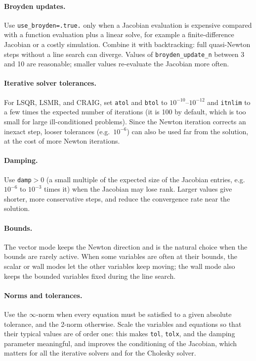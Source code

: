 \documentclass[11pt]{article}
\newcommand{\code}[1]{\texttt{#1}}
\begin{document}
\paragraph{Broyden updates.} Use \code{use\_broyden=.true.} only when a Jacobian evaluation is expensive
compared with a function evaluation plus a linear solve, for example a finite-difference Jacobian or a costly
simulation. Combine it with backtracking: full quasi-Newton steps without a line search can diverge. Values of
\code{broyden\_update\_n} between 3 and 10 are reasonable; smaller values re-evaluate the Jacobian more often.

\paragraph{Iterative solver tolerances.} For LSQR, LSMR, and CRAIG, set \code{atol} and \code{btol} to
$10^{-10}$--$10^{-12}$ and \code{itnlim} to a few times the expected number of iterations (it is 100 by default,
which is too small for large ill-conditioned problems). Since the Newton iteration corrects an inexact step,
looser tolerances (e.g.\ $10^{-6}$) can also be used far from the solution, at the cost of more Newton iterations.

\paragraph{Damping.} Use \code{damp}${}>0$ (a small multiple of the expected size of the Jacobian entries,
e.g.\ $10^{-6}$ to $10^{-3}$ times it) when the Jacobian may lose rank. Larger values give shorter, more
conservative steps, and reduce the convergence rate near the solution.

\paragraph{Bounds.} The vector mode keeps the Newton direction and is the natural choice when the bounds are
rarely active. When some variables are often at their bounds, the scalar or wall modes let the other variables
keep moving; the wall mode also keeps the bounded variables fixed during the line search.

\paragraph{Norms and tolerances.} Use the $\infty$-norm when every equation must be satisfied to a given absolute
tolerance, and the 2-norm otherwise. Scale the variables and equations so that their typical values are of order
one: this makes \code{tol}, \code{tolx}, and the damping parameter meaningful, and improves the conditioning of
the Jacobian, which matters for all the iterative solvers and for the Cholesky solver.
\end{document}

